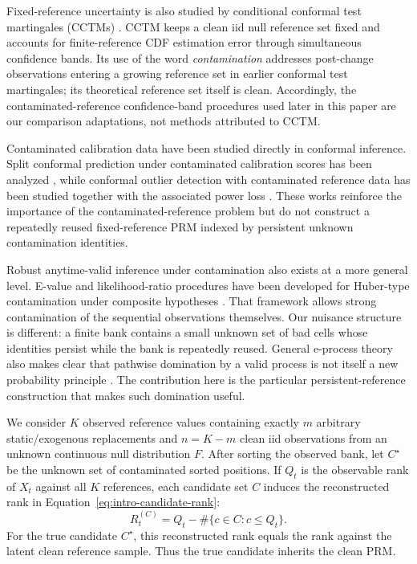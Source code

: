 Fixed-reference uncertainty is also studied by conditional conformal test martingales (CCTMs) \cite{ShaerEtAl2026}. CCTM keeps a clean iid null reference set fixed and accounts for finite-reference CDF estimation error through simultaneous confidence bands. Its use of the word \emph{contamination} addresses post-change observations entering a growing reference set in earlier conformal test martingales; its theoretical reference set itself is clean. Accordingly, the contaminated-reference confidence-band procedures used later in this paper are our comparison adaptations, not methods attributed to CCTM.

Contaminated calibration data have been studied directly in conformal inference. Split conformal prediction under contaminated calibration scores has been analyzed \cite{ClarksonEtAl2024}, while conformal outlier detection with contaminated reference data has been studied together with the associated power loss \cite{BashariEtAl2025}. These works reinforce the importance of the contaminated-reference problem but do not construct a repeatedly reused fixed-reference PRM indexed by persistent unknown contamination identities.

Robust anytime-valid inference under contamination also exists at a more general level. E-value and likelihood-ratio procedures have been developed for Huber-type contamination under composite hypotheses \cite{SahaRamdas2024}. That framework allows strong contamination of the sequential observations themselves. Our nuisance structure is different: a finite bank contains a small unknown set of bad cells whose identities persist while the bank is repeatedly reused. General e-process theory also makes clear that pathwise domination by a valid process is not itself a new probability principle \cite{RamdasEtAl2022}. The contribution here is the particular persistent-reference construction that makes such domination useful.

We consider \(K\) observed reference values containing exactly \(m\) arbitrary static/exogenous replacements and \(n=K-m\) clean iid observations from an unknown continuous null distribution \(F\). After sorting the observed bank, let \(C^\star\) be the unknown set of contaminated sorted positions. If \(Q_t\) is the observable rank of \(X_t\) against all \(K\) references, each candidate set \(C\) induces the reconstructed rank in Equation~\eqref{eq:intro-candidate-rank}:
\begin{equation}
  R_t^{(C)}
  =
  Q_t-\#\{c\in C:c\le Q_t\}.
  \label{eq:intro-candidate-rank}
\end{equation}
For the true candidate \(C^\star\), this reconstructed rank equals the rank against the latent clean reference sample. Thus the true candidate inherits the clean PRM.

